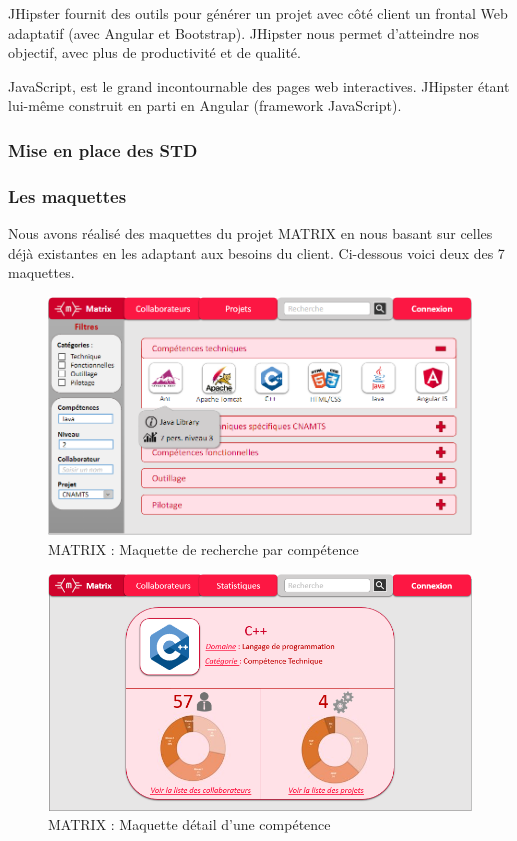 JHipster fournit des outils pour générer un projet avec côté client un frontal Web adaptatif (avec Angular et Bootstrap). JHipster nous permet d'atteindre nos objectif, avec plus de productivité et de qualité.

JavaScript, est le grand incontournable des pages web interactives. JHipster étant lui-même construit en parti en Angular (framework JavaScript).

\subsubsection{Mise en place des STD}

\subsubsection{Les maquettes}

Nous avons réalisé des maquettes du projet MATRIX en nous basant sur celles déjà existantes en les adaptant aux besoins du client. Ci-dessous voici deux des 7 maquettes.

\begin{figure}[!h]
\centering
\includegraphics[width=1\textwidth]{images/matrix-maquette.png}
\caption{MATRIX : Maquette de recherche par compétence}
\end{figure}

\begin{figure}[!h]
\centering
\includegraphics[width=1\textwidth]{images/matrix-maquette-competence.png}
\caption{MATRIX : Maquette détail d'une compétence}
\end{figure}

